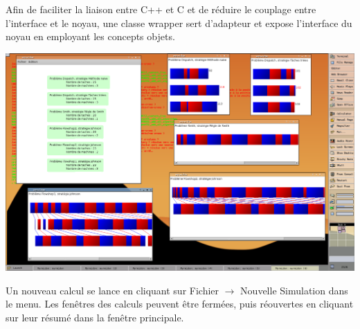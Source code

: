 Afin de faciliter la liaison entre C++ et C et de réduire le couplage entre
l'interface et le noyau, une classe wrapper sert d'adapteur et expose
l'interface du noyau en employant les concepts objets.
\begin{center}
\includegraphics{myrmidon.png}
\end{center}
Un nouveau calcul se lance en cliquant sur Fichier $\rightarrow$ Nouvelle
Simulation dans le menu.
Les fenêtres des calculs peuvent être fermées, puis réouvertes en cliquant sur leur résumé dans la fenêtre principale.
